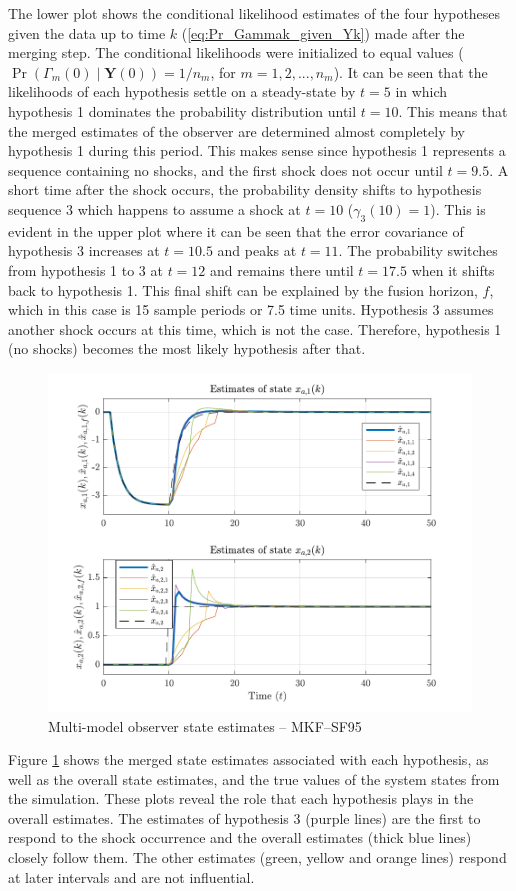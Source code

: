 The lower plot shows the conditional likelihood estimates of the four hypotheses given the data up to time $k$ (\ref{eq:Pr_Gammak_given_Yk}) made after the merging step. The conditional likelihoods were initialized to equal values ($\operatorname{Pr}\left(\Gamma_m(0) \mid \mathbf{Y}(0)\right)=1/n_m$, for $m=1,2,...,n_m$). It can be seen that the likelihoods of each hypothesis settle on a steady-state by $t=5$ in which hypothesis 1 dominates the probability distribution until $t=10$. This means that the merged estimates of the observer are determined almost completely by hypothesis 1 during this period. This makes sense since hypothesis 1 represents a sequence containing no shocks, and the first shock does not occur until $t=9.5$. A short time after the shock occurs, the probability density shifts to hypothesis sequence 3 which happens to assume a shock at $t=10$ ($\gamma_3(10)=1$). This is evident in the upper plot where it can be seen that the error covariance of hypothesis 3 increases at $t=10.5$ and peaks at $t=11$. The probability switches from hypothesis 1 to 3 at $t=12$ and remains there until $t=17.5$ when it shifts back to hypothesis 1. This final shift can be explained by the fusion horizon, $f$, which in this case is 15 sample periods or 7.5 time units. Hypothesis 3 assumes another shock occurs at this time, which is not the case. Therefore, hypothesis 1 (no shocks) becomes the most likely hypothesis after that.

\begin{figure}[htp]
	\centering
	\includegraphics[width=13cm]{images/rod_MKF_test_sim_MKF_SF95_x_est.pdf}
	\caption{Multi-model observer state estimates – MKF--SF95}
	\label{fig:rod-obs-sim-test-x_est-SF95}
\end{figure}
Figure \ref{fig:rod-obs-sim-test-x_est-SF95} shows the merged state estimates associated with each hypothesis, as well as the overall state estimates, and the true values of the system states from the simulation. These plots reveal the role that each hypothesis plays in the overall estimates. The estimates of hypothesis 3 (purple lines) are the first to respond to the shock occurrence and the overall estimates (thick blue lines) closely follow them. The other estimates (green, yellow and orange lines) respond at later intervals and are not influential.


